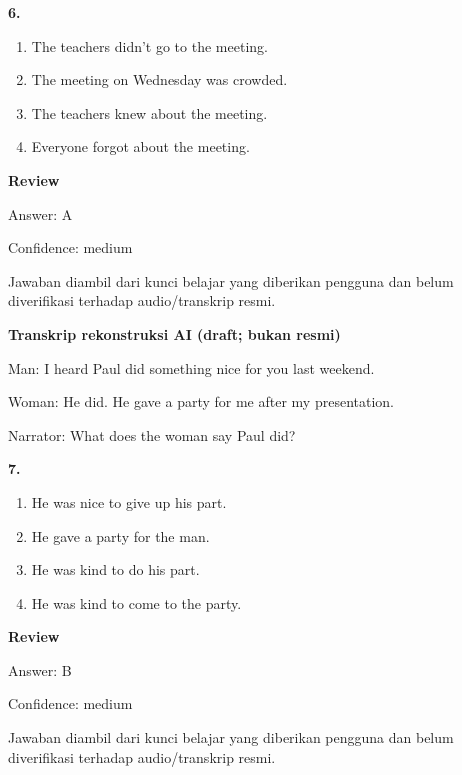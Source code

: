 \documentclass[12pt]{article}
\begin{document}
\noindent\textbf{6.}
\begin{enumerate}[label=(\Alph*),leftmargin=*,itemsep=0.2em]
\item The teachers didn't go to the meeting.
\item The meeting on Wednesday was crowded.
\item The teachers knew about the meeting.
\item Everyone forgot about the meeting.
\end{enumerate}
\par
\begingroup
\setlength{\parskip}{0pt}
\setlength{\parindent}{0pt}
\textbf{Review}\par
Answer: A\par
Confidence: medium\par
Jawaban diambil dari kunci belajar yang diberikan pengguna dan belum diverifikasi terhadap audio/transkrip resmi.\par
\endgroup
\par
\vspace{0.25\baselineskip}
\begin{exampleblock}
\textbf{Transkrip rekonstruksi AI (draft; bukan resmi)}\par
Man: I heard Paul did something nice for you last weekend.\par
Woman: He did. He gave a party for me after my presentation.\par
Narrator: What does the woman say Paul did?\par
\end{exampleblock}
\noindent\textbf{7.}
\begin{enumerate}[label=(\Alph*),leftmargin=*,itemsep=0.2em]
\item He was nice to give up his part.
\item He gave a party for the man.
\item He was kind to do his part.
\item He was kind to come to the party.
\end{enumerate}
\par
\begingroup
\setlength{\parskip}{0pt}
\setlength{\parindent}{0pt}
\textbf{Review}\par
Answer: B\par
Confidence: medium\par
Jawaban diambil dari kunci belajar yang diberikan pengguna dan belum diverifikasi terhadap audio/transkrip resmi.\par
\endgroup
\par
\vspace{0.25\baselineskip}
\end{document}
